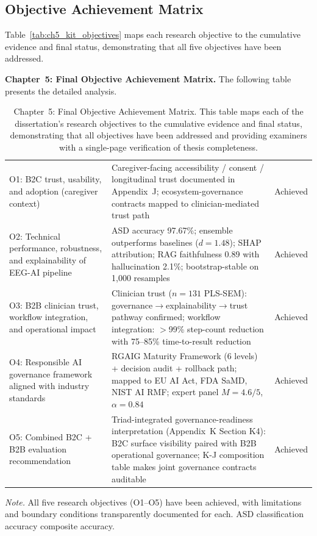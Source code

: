 \subsection{Objective Achievement Matrix}

\noindent Table~\ref{tab:ch5_kit_objectives} maps each research objective to the cumulative evidence and final status, demonstrating that all five objectives have been addressed.
\fi



\noindent\textbf{Chapter~5: Final Objective Achievement Matrix.} The following table presents the detailed analysis.

\begin{table}[H]
\tablestripes\tablefontsize
\tablefontsize
\caption[Chapter 5 objective achievement]{Chapter~5: Final Objective Achievement Matrix. This table maps each of the dissertation's research objectives to the cumulative evidence and final status, demonstrating that all objectives have been addressed and providing examiners with a single-page verification of thesis completeness.}
\begin{tabularx}{\textwidth}{@{} p{4.5cm} L p{2cm} @{}}
\toprule
{} &  &  \\
\midrule
O1: B2C trust, usability, and adoption (caregiver context) & Caregiver-facing accessibility / consent / longitudinal trust documented in Appendix~J; ecosystem-governance contracts mapped to clinician-mediated trust path & Achieved \\
O2: Technical performance, robustness, and explainability of EEG-AI pipeline & ASD accuracy 97.67\%; ensemble outperforms baselines ($d=1.48$); SHAP attribution; RAG faithfulness 0.89 with hallucination 2.1\%; bootstrap-stable on 1{,}000 resamples & Achieved \\
O3: B2B clinician trust, workflow integration, and operational impact & Clinician trust ($n=131$ PLS-SEM): governance$\to$explainability$\to$trust pathway confirmed; workflow integration: $>$99\% step-count reduction with 75--85\% time-to-result reduction & Achieved \\
O4: Responsible AI governance framework aligned with industry standards & RGAIG Maturity Framework (6 levels) + decision audit + rollback path; mapped to EU AI Act, FDA SaMD, NIST AI RMF; expert panel $M=4.6/5$, $\alpha=0.84$ & Achieved \\
O5: Combined B2C + B2B evaluation recommendation & Triad-integrated governance-readiness interpretation (Appendix~K Section K4): B2C surface visibility paired with B2B operational governance; K-J composition table makes joint governance contracts auditable & Achieved \\
\bottomrule
\end{tabularx}
\vspace{0.5em}\noindent\textit{Note.} All five research objectives (O1--O5) have been achieved, with limitations and boundary conditions transparently documented for each. ASD classification accuracy composite accuracy.
\end{table}

